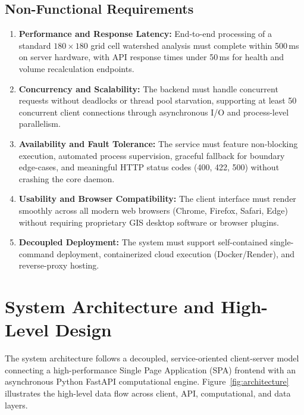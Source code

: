\documentclass[manuscript,screen,review]{acmart}
\begin{document}
\subsection{Non-Functional Requirements}
\begin{enumerate}
    \item \textbf{Performance and Response Latency:} End-to-end processing of a standard $180 \times 180$ grid cell watershed analysis must complete within 500\,ms on server hardware, with API response times under 50\,ms for health and volume recalculation endpoints.
    \item \textbf{Concurrency and Scalability:} The backend must handle concurrent requests without deadlocks or thread pool starvation, supporting at least 50 concurrent client connections through asynchronous I/O and process-level parallelism.
    \item \textbf{Availability and Fault Tolerance:} The service must feature non-blocking execution, automated process supervision, graceful fallback for boundary edge-cases, and meaningful HTTP status codes (400, 422, 500) without crashing the core daemon.
    \item \textbf{Usability and Browser Compatibility:} The client interface must render smoothly across all modern web browsers (Chrome, Firefox, Safari, Edge) without requiring proprietary GIS desktop software or browser plugins.
    \item \textbf{Decoupled Deployment:} The system must support self-contained single-command deployment, containerized cloud execution (Docker/Render), and reverse-proxy hosting.
\end{enumerate}

\section{System Architecture and High-Level Design}
\label{sec:architecture}
The system architecture follows a decoupled, service-oriented client-server model connecting a high-performance Single Page Application (SPA) frontend with an asynchronous Python FastAPI computational engine. Figure~\ref{fig:architecture} illustrates the high-level data flow across client, API, computational, and data layers.
\end{document}
